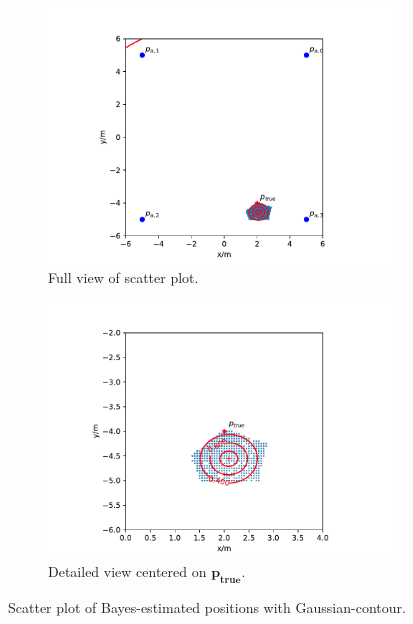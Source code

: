\documentclass{article}
\begin{document}
\begin{itemize}
\begin{figure}[h]
\begin{subfigure}{\textwidth}
\centering
\includegraphics[width=\textwidth]{./figures/scenario3_gausscont_small_bayes.pdf}
\caption{Full view of scatter plot.}
\end{subfigure}

\begin{subfigure}{\textwidth}
\includegraphics[width=\textwidth]{./figures/scenario3_gausscont_big_bayes.pdf}
\caption{Detailed view centered on $\mathbf{p_{true}}$.}
\end{subfigure}
\caption{Scatter plot of Bayes-estimated positions with Gaussian-contour.}
\label{fig:scenario3_gausscont_bayes}
\end{figure}

\end{itemize}
\end{document}
